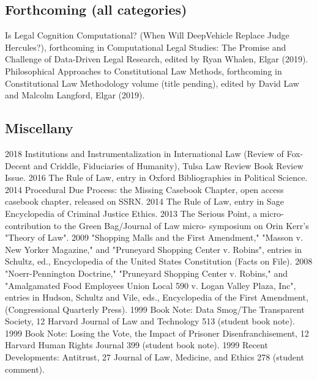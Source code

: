 \documentclass[letterpaper]{moderncv}
\begin{document}
\subsection{Forthcoming (all categories)}
\cvitem
{}
{Is Legal Cognition Computational? (When Will DeepVehicle Replace Judge Hercules?), forthcoming in Computational Legal Studies: The Promise and Challenge of Data-Driven Legal Research, edited by Ryan Whalen, Elgar (2019).}
\vspace{1mm}
\cvitem
{}
{Philosophical Approaches to Constitutional Law Methods, forthcoming in Constitutional Law Methodology volume (title pending), edited by David Law and Malcolm Langford, Elgar (2019).}
\vspace{1mm}

\subsection{Miscellany}
\cvitem
{2018}
{Institutions and Instrumentalization in International Law (Review of Fox-Decent and Criddle, Fiduciaries of Humanity), Tulsa Law Review Book Review Issue.}
\vspace{1mm}
\cvitem
{2016}
{The Rule of Law, entry in Oxford Bibliographies in Political Science.}
\vspace{1mm}
\cvitem
{2014}
{Procedural Due Process: the Missing Casebook Chapter, open access casebook chapter, released on SSRN.}
\vspace{1mm}
\cvitem
{2014}
{The Rule of Law, entry in Sage Encyclopedia of Criminal Justice Ethics.}
\vspace{1mm}
\cvitem
{2013}
{The Serious Point, a micro-contribution to the Green Bag/Journal of Law micro- symposium on Orin Kerr's "Theory of Law".}
\vspace{1mm}
\cvitem
{2009}
{"Shopping Malls and the First Amendment," "Masson v. New Yorker Magazine," and "Pruneyard Shopping Center v. Robins", entries in Schultz, ed., Encyclopedia of the United States Constitution (Facts on File).}
\vspace{1mm}
\cvitem
{2008}
{"Noerr-Pennington Doctrine," "Pruneyard Shopping Center v. Robins," and "Amalgamated Food Employees Union Local 590 v. Logan Valley Plaza, Inc", entries in Hudson, Schultz and Vile, eds., Encyclopedia of the First Amendment, (Congressional Quarterly Press).}
\vspace{1mm}
\cvitem
{1999}
{Book Note: Data Smog/The Transparent Society, 12 Harvard Journal of Law and Technology 513 (student book note).}
\vspace{1mm}
\cvitem
{1999}
{Book Note: Losing the Vote, the Impact of Prisoner Disenfranchisement, 12 Harvard Human Rights Journal 399 (student book note).}
\vspace{1mm}
\cvitem
{1999}
{Recent Developments: Antitrust, 27 Journal of Law, Medicine, and Ethics 278 (student comment).}
\vspace{1mm}
\end{document}
